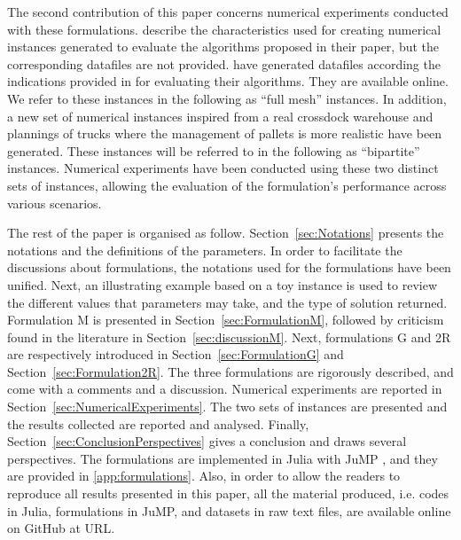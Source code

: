 \documentclass[preprint,12pt,authoryear]{elsarticle}
\begin{document}
The second contribution of this paper concerns numerical experiments conducted with these formulations.
%
\citet{MIAO2009} describe the characteristics used for creating numerical instances generated to evaluate the algorithms proposed in their paper, but the corresponding datafiles are not provided.
%
\citet{GELAREH2016}  have generated datafiles  according the indications provided in \citep{MIAO2009} for evaluating their algorithms. They are available online.
%
We refer to these instances in the following as ``full mesh'' instances.
%
In addition, a new set of numerical instances inspired from a real crossdock warehouse and plannings of trucks where the management of pallets is more realistic have been generated.
These instances will be referred to in the following as ``bipartite'' instances.
%
Numerical experiments have been conducted using these two distinct sets of instances, allowing the evaluation of the formulation's performance across various scenarios.

The rest of the paper is organised as follow.
%
Section~\ref{sec:Notations} presents  the notations and the definitions of the parameters. 
In order to facilitate the discussions about formulations,  the notations used for the formulations have been unified.
Next, an illustrating example based on a toy instance is used to review the different values that  parameters may take, and the type of solution returned.
%
Formulation M is presented in Section~\ref{sec:FormulationM}, followed by criticism found in the literature in Section~\ref{sec:discussionM}.
%
Next, formulations G and 2R are respectively introduced in Section~\ref{sec:FormulationG} and Section~\ref{sec:Formulation2R}.
The three formulations are rigorously described, and come with a comments and a discussion.
%
Numerical experiments are reported in Section~\ref{sec:NumericalExperiments}. The two sets of instances are presented and the results collected are reported and analysed.
%
Finally, Section~\ref{sec:ConclusionPerspectives} gives a conclusion and draws several perspectives.
%
The formulations are implemented in Julia \citep{Julia2017} with JuMP \citep{JuMP2023}, and they are provided in \ref{app:formulations}. 
Also, in order to allow the readers to reproduce all results presented in this paper, all the material produced, i.e. codes in Julia, formulations in JuMP, and datasets in raw text files, are available online on GitHub at \color{red}URL\color{black}.

\newpage
%
%
\end{document}
